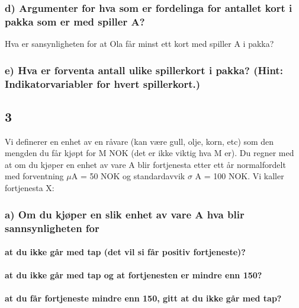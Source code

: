 \documentclass[
  12pt,
  a4paper,
  DIV=11,
  numbers=noendperiod]{scrartcl}
\let\oldparagraph\paragraph
\renewcommand{\paragraph}[1]{\oldparagraph{#1}\mbox{}}
\begin{document}
\subsubsection{d) Argumenter for hva som er fordelinga for antallet kort
i pakka som er med spiller
A?}\label{d-argumenter-for-hva-som-er-fordelinga-for-antallet-kort-i-pakka-som-er-med-spiller-a}

Hva er sansynligheten for at Ola får minst ett kort med spiller A i
pakka?

\subsubsection{e) Hva er forventa antall ulike spillerkort i pakka?
(Hint: Indikatorvariabler for hvert
spillerkort.)}\label{e-hva-er-forventa-antall-ulike-spillerkort-i-pakka-hint-indikatorvariabler-for-hvert-spillerkort.}

\subsection{3}\label{section-2}

Vi definerer en enhet av en råvare (kan være gull, olje, korn, etc) som
den mengden du får kjøpt for M NOK (det er ikke viktig hva M er). Du
regner med at om du kjøper en enhet av vare A blir fortjenesta etter ett
år normalfordelt med forventning \(\mu\)A = 50 NOK og standardavvik
\(\sigma\) A = 100 NOK. Vi kaller fortjenesta X:

\subsubsection{a) Om du kjøper en slik enhet av vare A hva blir
sannsynligheten
for}\label{a-om-du-kjuxf8per-en-slik-enhet-av-vare-a-hva-blir-sannsynligheten-for}

\paragraph{at du ikke går med tap (det vil si får positiv
fortjeneste)?}\label{at-du-ikke-guxe5r-med-tap-det-vil-si-fuxe5r-positiv-fortjeneste}

\paragraph{at du ikke går med tap og at fortjenesten er mindre enn
150?}\label{at-du-ikke-guxe5r-med-tap-og-at-fortjenesten-er-mindre-enn-150}

\paragraph{at du får fortjeneste mindre enn 150, gitt at du ikke går med
tap?}\label{at-du-fuxe5r-fortjeneste-mindre-enn-150-gitt-at-du-ikke-guxe5r-med-tap}
\end{document}
